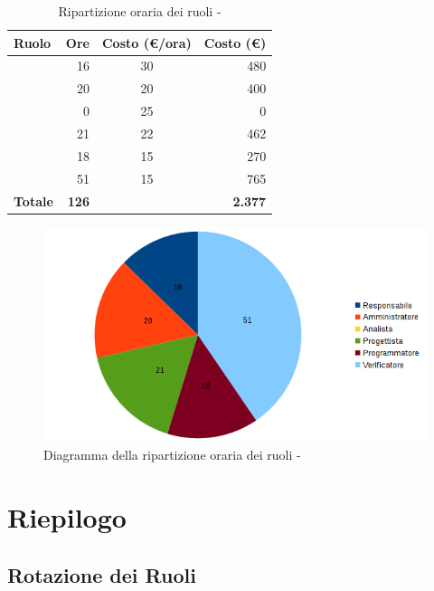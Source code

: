 \documentclass[12pt,a4paper]{article}
\begin{document}
\begin{table}[H]
	\begin{center}
		\begin{tabular}{l r c r}
			\toprule
			\textbf{Ruolo}	& \textbf{Ore} & \textbf{Costo (\euro/ora)}	& \textbf{Costo (\euro)} \\
			\midrule
			\midrule
			\RE & 16 & 30 & 480\\
			\midrule
			\AM & 20 & 20 & 400\\ 
			\midrule
			\AN & 0 & 25 & 0\\ 
			\midrule
			\PG & 21 & 22 & 462\\ 
			\midrule
			\PR & 18 & 15 & 270\\ 
			\midrule
			\VR & 51 & 15 & 765\\ 
			\midrule
			\textbf{Totale} & \textbf{126} &  & \textbf{2.377}\\
			\bottomrule
		\end{tabular}
		\caption{Ripartizione oraria dei ruoli - \FVV}
	\end{center}
\end{table}

\begin{center}
	\begin{figure}[H]
		\centering
		\includegraphics[width=\textwidth]{diagrammaTortaVerificaValidazioneTotaleOre.png}
		\caption{Diagramma della ripartizione oraria dei ruoli - \FVV}
	\end{figure}
\end{center}

\newpage

\section{Riepilogo}
\subsection{Rotazione dei Ruoli}
\end{document}
